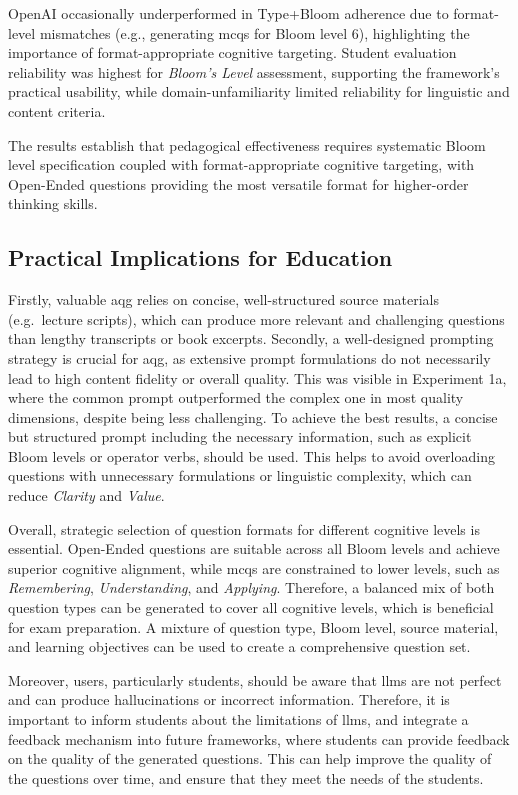 OpenAI occasionally underperformed in Type+Bloom adherence due to format-level mismatches (e.g., generating \acp{mcq} for Bloom level 6), highlighting the importance of format-appropriate cognitive targeting. Student evaluation reliability was highest for \textit{Bloom's Level} assessment, supporting the framework's practical usability, while domain-unfamiliarity limited reliability for linguistic and content criteria.

The results establish that pedagogical effectiveness requires systematic Bloom level specification coupled with format-appropriate cognitive targeting, with Open-Ended questions providing the most versatile format for higher-order thinking skills.


\subsection{Practical Implications for Education}

Firstly, valuable \ac{aqg} relies on concise, well-structured source materials (e.g.\ lecture scripts), which can produce more relevant and challenging questions than lengthy transcripts or book excerpts. Secondly, a well-designed prompting strategy is crucial for \ac{aqg}, as extensive prompt formulations do not necessarily lead to high content fidelity or overall quality. This was visible in Experiment 1a, where the common prompt outperformed the complex one in most quality dimensions, despite being less challenging. To achieve the best results, a concise but structured prompt including the necessary information, such as explicit Bloom levels or operator verbs, should be used. This helps to avoid overloading questions with unnecessary formulations or linguistic complexity, which can reduce \textit{Clarity} and \textit{Value}.

Overall, strategic selection of question formats for different cognitive levels is essential. Open-Ended questions are suitable across all Bloom levels and achieve superior cognitive alignment, while \acp{mcq} are constrained to lower levels, such as \textit{Remembering}, \textit{Understanding}, and \textit{Applying}. Therefore, a balanced mix of both question types can be generated to cover all cognitive levels, which is beneficial for exam preparation. A mixture of question type, Bloom level, source material, and learning objectives can be used to create a comprehensive question set.

Moreover, users, particularly students, should be aware that \acp{llm} are not perfect and can produce hallucinations or incorrect information. Therefore, it is important to inform students about the limitations of \acp{llm}, and integrate a feedback mechanism into future frameworks, where students can provide feedback on the quality of the generated questions. This can help improve the quality of the questions over time, and ensure that they meet the needs of the students.

